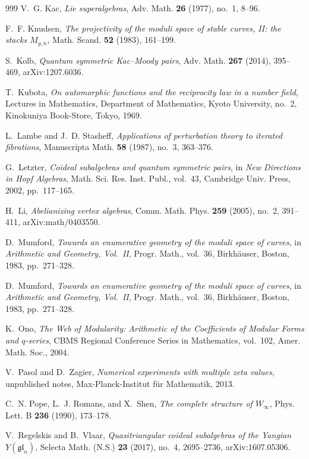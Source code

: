 \documentclass[11pt]{memoir}
\begin{document}
\begin{thebibliography}{999}
V.~G. Kac, \emph{Lie superalgebras}, Adv. Math. \textbf{26} (1977), no.~1, 8--96.

F.~F. Knudsen, \emph{The projectivity of the moduli space of stable curves, II: the stacks $M_{g,n}$}, Math. Scand. \textbf{52} (1983), 161--199.

S.~Kolb, \emph{Quantum symmetric Kac--Moody pairs}, Adv. Math. \textbf{267} (2014), 395--469, arXiv:1207.6036.

T.~Kubota, \emph{On automorphic functions and the reciprocity law in a number field}, Lectures in Mathematics, Department of Mathematics, Kyoto University, no.~2, Kinokuniya Book-Store, Tokyo, 1969.

L.~Lambe and J.~D. Stasheff, \emph{Applications of perturbation theory to iterated fibrations}, Manuscripta Math. \textbf{58} (1987), no.~3, 363--376.

G.~Letzter, \emph{Coideal subalgebras and quantum symmetric pairs}, in \emph{New Directions in Hopf Algebras}, Math. Sci. Res. Inst. Publ., vol.~43, Cambridge Univ. Press, 2002, pp.~117--165.

H.~Li, \emph{Abelianizing vertex algebras}, Comm. Math. Phys. \textbf{259} (2005), no.~2, 391--411, arXiv:math/0403550.

D.~Mumford, \emph{Towards an enumerative geometry of the moduli space of curves}, in \emph{Arithmetic and Geometry, Vol.~II}, Progr. Math., vol.~36, Birkh\"auser, Boston, 1983, pp.~271--328.

D.~Mumford, \emph{Towards an enumerative geometry of the moduli space of curves}, in \emph{Arithmetic and Geometry, Vol.~II}, Progr. Math., vol.~36, Birkh\"auser, Boston, 1983, pp.~271--328.

K.~Ono, \emph{The Web of Modularity: Arithmetic of the Coefficients of Modular Forms and $q$-series}, CBMS Regional Conference Series in Mathematics, vol.~102, Amer. Math. Soc., 2004.

V.~Pasol and D.~Zagier, \emph{Numerical experiments with multiple zeta values}, unpublished notes, Max-Planck-Institut f\"ur Mathematik, 2013.

C.~N. Pope, L.~J. Romans, and X.~Shen, \emph{The complete structure of $W_\infty$}, Phys. Lett. B \textbf{236} (1990), 173--178.

V.~Regelskis and B.~Vlaar, \emph{Quasitriangular coideal subalgebras of the Yangian $Y(\mathfrak{gl}_n)$}, Selecta Math. (N.S.) \textbf{23} (2017), no.~4, 2695--2736, arXiv:1607.05306.


\end{thebibliography}
\end{document}
